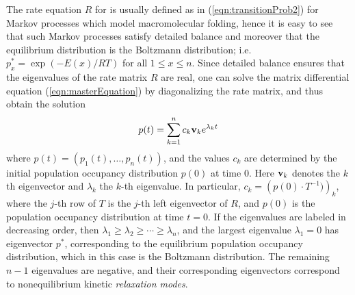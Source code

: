 The rate equation $R$ for is usually defined
as in (\ref{eqn:transitionProb2}) for
Markov processes which model macromolecular folding,
hence it is easy to see that
such Markov processes satisfy detailed balance and moreover that
the equilibrium distribution is the
Boltzmann distribution; i.e.  $p^*_x = \exp(-E(x)/RT)$ for
all $1 \leq x \leq n$.
Since detailed balance ensures that the eigenvalues of the rate matrix $R$ are
real, one can solve the matrix differential equation
(\ref{eqn:masterEquation}) by diagonalizing the rate matrix, and thus obtain
the solution
\begin{eqnarray}
\label{eqn:populationOccupancyEquation}
p(t) = \sum_{k=1}^n c_k {\bf v}_k e^{\lambda_k t}
\end{eqnarray}
where $p(t) = (p_1(t),\ldots,p_n(t))$, and the
values $c_k$ are determined by the initial population occupancy
distribution $p(0)$ at time $0$. Here
${\bf v}_k$ denotes the $k$th eigenvector and
$\lambda_k$ the $k$-th eigenvalue. In particular,
$c_k = \left(p(0) \cdot T^{-1})\right)_k$, where the $j$-th row of $T$
is the $j$-th left eigenvector of $R$,
and $p(0)$ is the population occupancy distribution
at time $t=0$. If the eigenvalues are labeled in decreasing
order, then $\lambda_1 \geq \lambda_2 \geq \cdots \geq \lambda_n$,
and the largest eigenvalue $\lambda_1=0$ has eigenvector $p^*$, corresponding
to the equilibrium population occupancy distribution, which in this case
is the Boltzmann distribution. The
remaining $n-1$ eigenvalues are negative, and their corresponding eigenvectors
correspond to nonequilibrium kinetic {\em relaxation modes}.

